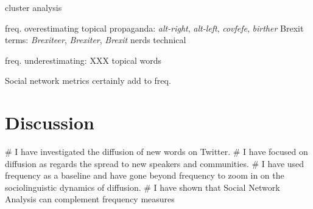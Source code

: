 \documentclass[
  a4paper,
  abstract=on,
  captions=tableabove
  ]{scrartcl}
\begin{document}
  cluster analysis

  freq. overestimating
  topical
  propaganda: \emph{alt-right}, \emph{alt-left}, \emph{covfefe}, \emph{birther}
  Brexit terms: \emph{Brexiteer}, \emph{Brexiter}, \emph{Brexit}
  nerds
  technical

  freq. underestimating: XXX
  topical words

  Social network metrics certainly add to freq.

\section{Discussion}
  \label{sec:discussion}


    \begin{qitem}
      # I have investigated the diffusion of new words on Twitter.
      # I have focused on diffusion as regards the spread to new speakers and communities.
      # I have used frequency as a baseline and have gone beyond frequency to zoom in on the sociolinguistic dynamics of diffusion.
      # I have shown that Social Network Analysis can complement frequency measures
    \end{qitem}

\end{document}
